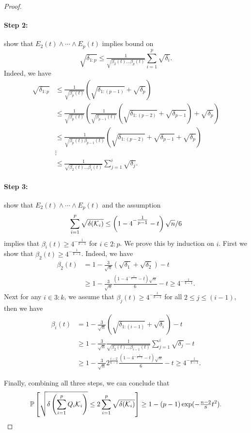 \begin{proof}
    \paragraph{Step 2:} show that $E_2(t) \land\cdots\land E_p(t)$ implies bound on \[\sqrt{\delta_{1:p}}\leq\tfrac{1}{\sqrt{\beta_2(t)\dots\beta_p(t)}}\sum_{i=1}^p\sqrt{\delta_i}.\] Indeed, we have 
    \begin{align*}
      \sqrt{\delta_{1:p}} &\leq \tfrac{1}{\sqrt{\beta_p(t)}}\left( \sqrt{\delta_{1:(p-1)}} + \sqrt{\delta_p}\right)
      \\&\leq \tfrac{1}{\sqrt{\beta_p(t)}}\left( \tfrac{1}{\sqrt{\beta_{p-1}(t)}}\left( \sqrt{\delta_{1:(p-2)}} + \sqrt{\delta_{p-1}}\right) + \sqrt{\delta_p}\right)
      \\&\leq \tfrac{1}{\sqrt{\beta_p(t)\beta_{p-1}(t)}}\left( \sqrt{\delta_{1:(p-2)}} + \sqrt{\delta_{p-1}} + \sqrt{\delta_p}\right)
      \\&\vdots
      \\&\leq \tfrac{1}{\sqrt{\beta_2(t)\dots\beta_i(t)}}\sum_{j=1}^i\sqrt{\delta_j}.
    \end{align*}
    
    \paragraph{Step 3:} show that $E_2(t) \land\cdots\land E_p(t)$ and the assumption \[\sum_{i=1}^p \sqrt{\delta(\mathcal{K}_i)} \leq \left(1 - 4^{- \tfrac{1}{p-1} } - t\right)\sqrt{n} / 6\] implies that $\beta_i(t) \geq 4^{-\tfrac{1}{k-1} }$ for $i\in2:p$. We prove this by induction on $i$. First we show that $\beta_2(t) \geq 4^{-\tfrac{1}{k-1} }$. Indeed, we have 
    \begin{align*}
      \beta_2(t) &= 1 - \tfrac{3}{\sqrt{n}}\left( \sqrt{\delta_1} + \sqrt{\delta_2}\right) - t
      \\&\geq 1 - \tfrac{3}{\sqrt{n}}\tfrac{ \left(1 - 4^{- \tfrac{1}{k-1} } - t\right)\sqrt{n} }{6} - t
      \geq  4^{-\tfrac{1}{k-1} }.
    \end{align*}
     Next for any $i\in3:k$, we assume that $\beta_j(t) \geq 4^{-\tfrac{1}{k-1} }$ for all $2\leq j \leq (i-1)$, then we have 
    \begin{align*}
      \beta_i(t) &=  1 - \tfrac{3}{\sqrt{n}}\left( \sqrt{\delta_{1:(i-1)}} + \sqrt{\delta_i}\right) - t
      \\&\geq 1 - \tfrac{3}{\sqrt{n}} \tfrac{1}{\sqrt{\beta_2(t)\dots\beta_{i-1}(t)}}\sum_{j=1}^{i}\sqrt{\delta_j} - t
      \\&\geq 1 - \tfrac{3}{\sqrt{n}} 2^{ \tfrac{i-2}{k-1} } \tfrac{ \left(1 - 4^{- \tfrac{1}{k-1} } - t\right)\sqrt{n} }{6} - t
      \geq 4^{- \tfrac{1}{k-1} }.
    \end{align*}
    
    Finally, combining all three steps, we can conclude that 
    \begin{equation*}
      \mathbb{P}\left[ \sqrt{\delta\left(\sum_{i=1}^pQ_i\mathcal{K}_i\right)} \leq 2\sum_{i=1}^p \sqrt{\delta(\mathcal{K}_i)}\right] \geq 1 - (p-1)\exp(-\tfrac{n-2}{8}t^2).
    \end{equation*}
\end{proof}

